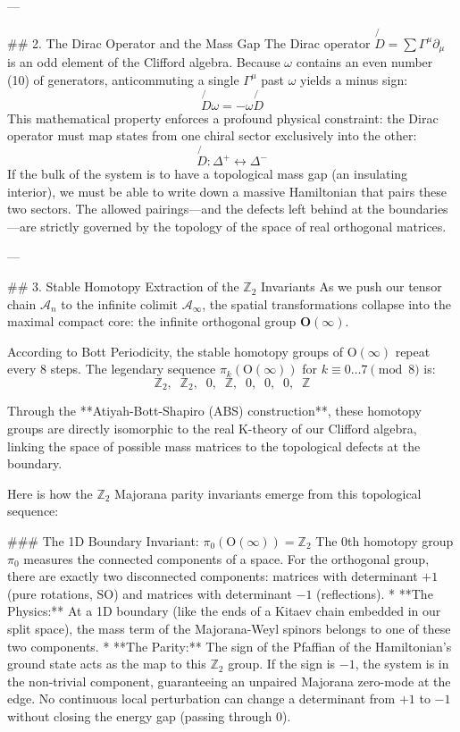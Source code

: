---

## 2. The Dirac Operator and the Mass Gap
The Dirac operator $\not{D} = \sum \Gamma^\mu \partial_\mu$ is an odd element of the Clifford algebra. Because $\omega$ contains an even number (10) of generators, anticommuting a single $\Gamma^\mu$ past $\omega$ yields a minus sign:
$$ \not{D}\omega = -\omega\not{D} $$
This mathematical property enforces a profound physical constraint: the Dirac operator must map states from one chiral sector exclusively into the other:
$$ \not{D} : \Delta^+ \longleftrightarrow \Delta^- $$
If the bulk of the system is to have a topological mass gap (an insulating interior), we must be able to write down a massive Hamiltonian that pairs these two sectors. The allowed pairings—and the defects left behind at the boundaries—are strictly governed by the topology of the space of real orthogonal matrices.

---

## 3. Stable Homotopy Extraction of the $\mathbb{Z}_2$ Invariants
As we push our tensor chain $\mathcal{A}_n$ to the infinite colimit $\mathcal{A}_\infty$, the spatial transformations collapse into the maximal compact core: the infinite orthogonal group $\mathbf{O(\infty)}$.

According to Bott Periodicity, the stable homotopy groups of $\text{O}(\infty)$ repeat every 8 steps. The legendary sequence $\pi_k(\text{O}(\infty))$ for $k \equiv 0 \dots 7 \pmod 8$ is:
$$ \mathbb{Z}_2, \;\; \mathbb{Z}_2, \;\; 0, \;\; \mathbb{Z}, \;\; 0, \;\; 0, \;\; 0, \;\; \mathbb{Z} $$

Through the **Atiyah-Bott-Shapiro (ABS) construction**, these homotopy groups are directly isomorphic to the real K-theory of our Clifford algebra, linking the space of possible mass matrices to the topological defects at the boundary.

Here is how the $\mathbb{Z}_2$ Majorana parity invariants emerge from this topological sequence:

### The 1D Boundary Invariant: $\pi_0(\text{O}(\infty)) = \mathbb{Z}_2$
The 0th homotopy group $\pi_0$ measures the connected components of a space. For the orthogonal group, there are exactly two disconnected components: matrices with determinant $+1$ (pure rotations, $\text{SO}$) and matrices with determinant $-1$ (reflections). 
* **The Physics:** At a 1D boundary (like the ends of a Kitaev chain embedded in our split space), the mass term of the Majorana-Weyl spinors belongs to one of these two components. 
* **The Parity:** The sign of the Pfaffian of the Hamiltonian's ground state acts as the map to this $\mathbb{Z}_2$ group. If the sign is $-1$, the system is in the non-trivial component, guaranteeing an unpaired Majorana zero-mode at the edge. No continuous local perturbation can change a determinant from $+1$ to $-1$ without closing the energy gap (passing through 0).

